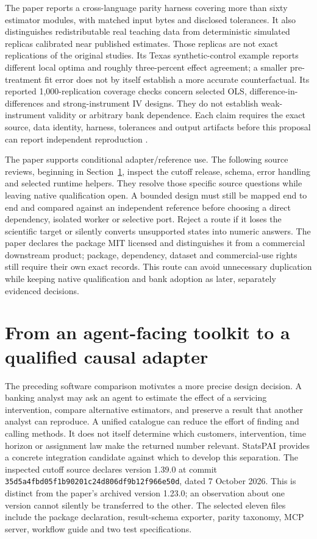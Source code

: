 The paper reports a cross-language parity harness covering more than sixty
estimator modules, with matched input bytes and disclosed tolerances. It also
distinguishes redistributable real teaching data from deterministic simulated
replicas calibrated near published estimates. Those replicas are not exact
replications of the original studies. Its Texas synthetic-control example
reports different local optima and roughly three-percent effect agreement;
a smaller pre-treatment fit error does not by itself establish a more accurate
counterfactual. Its reported 1,000-replication coverage checks concern selected
OLS, difference-in-differences and strong-instrument IV designs. They do not
establish weak-instrument validity or arbitrary bank dependence. Each claim
requires the exact source, data identity, harness, tolerances and output
artifacts before this proposal can report independent reproduction
\citep{exec23_statspai_paper}.

The paper supports conditional adapter/reference use. The following source reviews, beginning in Section~\ref{exec23:statspai-contract-scope}, inspect the cutoff release, schema, error handling and selected runtime helpers. They resolve those specific source questions while leaving native qualification open. A bounded design must still be mapped end to end and compared against an independent reference before choosing a direct dependency, isolated worker or selective port. Reject a route if it loses the
scientific target or silently converts unsupported states into numeric
answers. The paper declares the package MIT licensed and distinguishes it
from a commercial downstream product; package, dependency, dataset and
commercial-use rights still require their own exact records. This route
can avoid unnecessary duplication while keeping native qualification and
bank adoption as later, separately evidenced decisions.


\section{From an agent-facing toolkit to a qualified causal adapter}
\label{exec23:statspai-contract-scope}
The preceding software comparison motivates a more precise design decision.
A banking analyst may ask an agent to estimate the effect of a servicing
intervention, compare alternative estimators, and preserve a result that another
analyst can reproduce. A unified catalogue can reduce the effort of finding and
calling methods. It does not itself determine which customers, intervention,
time horizon or assignment law make the returned number relevant. StatsPAI
provides a concrete integration candidate against which to develop this
separation. The inspected cutoff source declares version 1.39.0 at commit
\texttt{35d5a4fbd05f1b90201c24d806df9b12f966e50d}, dated 7 October 2026.
This is distinct from the paper's archived version 1.23.0; an observation about
one version cannot silently be transferred to the other. The selected eleven
files include the package declaration, result-schema exporter, parity taxonomy,
MCP server, workflow guide and two test specifications.
\citep{exec23_statspai_contract,exec23_statspai_paper}

